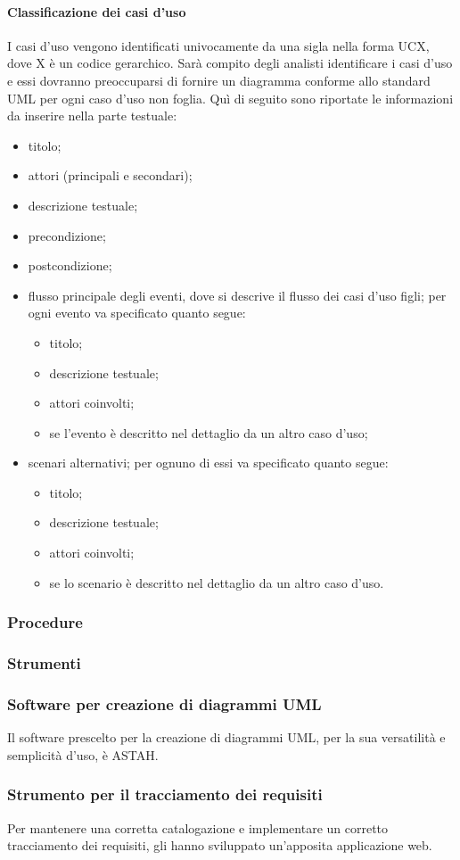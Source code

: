 			\paragraph{Classificazione dei casi d'uso}
				I casi d'uso vengono identificati univocamente da una sigla nella forma UCX, dove X è un codice gerarchico. Sarà compito degli analisti identificare i casi d'uso e essi dovranno preoccuparsi di fornire un diagramma conforme allo standard UML per ogni caso d'uso non foglia. Quì di seguito sono riportate le informazioni da inserire nella parte testuale:
				\begin{itemize}
					\item titolo;
					\item attori (principali e secondari);
					\item descrizione testuale;
					\item precondizione;
					\item postcondizione;
					\item flusso principale degli eventi, dove si descrive il flusso dei casi d'uso figli; per ogni evento va specificato quanto segue:
					\begin{itemize}
						\item titolo;
						\item descrizione testuale;
						\item attori coinvolti;
						\item se l’evento è descritto nel dettaglio da un altro caso d’uso;
					\end{itemize}
					\item scenari alternativi; per ognuno di essi va specificato quanto segue:
					\begin{itemize}
						\item titolo;
						\item descrizione testuale;
						\item attori coinvolti;
						\item se lo scenario è descritto nel dettaglio da un altro caso d’uso.
					\end{itemize}
				\end{itemize}
		\subsubsection{Procedure}
		\subsubsection{Strumenti}
			\subsubsection{Software per creazione di diagrammi UML}
			Il software prescelto per la creazione di diagrammi UML, per la sua versatilità e semplicità d'uso, è ASTAH.
			\subsubsection{Strumento per il tracciamento dei requisiti}
			Per mantenere una corretta catalogazione e implementare un corretto tracciamento dei requisiti, gli  hanno sviluppato un'apposita applicazione web.
